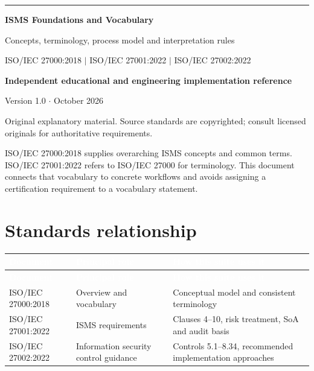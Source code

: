 \documentclass[11pt,letterpaper]{article}
\begin{document}
\begin{titlepage}
\vspace*{1.2in}
{\color{teal}\rule{\textwidth}{4pt}}\par\vspace{20pt}
{\Huge\bfseries\color{navy} ISMS Foundations and Vocabulary}\par\vspace{18pt}
{\Large\color{graytext} Concepts, terminology, process model and interpretation rules}\par\vspace{1.3in}
{\large ISO/IEC 27000:2018 $\vert$ ISO/IEC 27001:2022 $\vert$ ISO/IEC 27002:2022}\par
\vfill
\textbf{Independent educational and engineering implementation reference}\par
Version 1.0 $\cdot$ October 2026\par
{\small Original explanatory material. Source standards are copyrighted; consult licensed originals for authoritative requirements.}\par
\end{titlepage}
\tableofcontents\clearpage{}
\begin{tcolorbox}[title={How to use this reference},colback=pale,colframe=teal,breakable]
\SourceTag ISO/IEC 27000:2018 supplies overarching ISMS concepts and common terms. ISO/IEC 27001:2022 refers to ISO/IEC 27000 for terminology. \EngineeringTag This document connects that vocabulary to concrete workflows and avoids assigning a certification requirement to a vocabulary statement.
\end{tcolorbox}
\section{Standards relationship}
\small{}\begin{longtable}{>{\raggedright\arraybackslash}p{}>{\raggedright\arraybackslash}p{}>{\raggedright\arraybackslash}p{}}
\rowcolor{navy} \textcolor{white}{\textbf{Document}} & \textcolor{white}{\textbf{Principal role}} & \textcolor{white}{\textbf{How this suite uses it}}\\
\endfirsthead
\rowcolor{navy} \textcolor{white}{\textbf{Document}} & \textcolor{white}{\textbf{Principal role}} & \textcolor{white}{\textbf{How this suite uses it}}\\
\endhead
ISO/IEC 27000:2018 & Overview and vocabulary & Conceptual model and consistent terminology\\
ISO/IEC 27001:2022 & ISMS requirements & Clauses 4--10, risk treatment, SoA and audit basis\\
ISO/IEC 27002:2022 & Information security control guidance & Controls 5.1--8.34, recommended implementation approaches\\
\end{longtable}\normalsize
\end{document}

